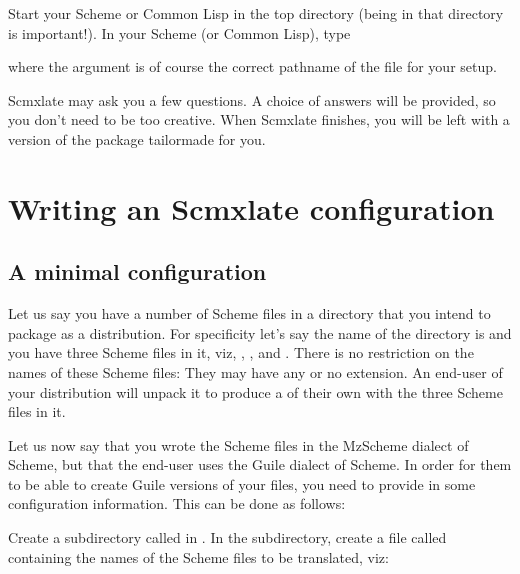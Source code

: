 Start your Scheme or Common Lisp in the top directory
(being in that directory is important!).  In your
Scheme (or Common Lisp), type


\n where the  argument is of course the correct
pathname of the file  for your
setup.

Scmxlate may ask you a few questions.  A
choice of answers will be provided, so you don't need
to be too creative.  When Scmxlate finishes, you
will be left with a version of the package tailormade
for you.

\section{Writing an Scmxlate configuration}
\label{writeconfig}

%

\subsection{A minimal configuration}

Let us say you have a number of Scheme files in
a directory that you intend to package as a
distribution.  For specificity let's say the name of the
directory is  and you have three Scheme files in it,
viz, , , and .
There is no restriction on the names of these Scheme
files: They may have any or no extension.  An end-user
of your distribution will unpack it to produce a
 of their own with the three Scheme files in
it.

Let us now say that you wrote the Scheme files in the
MzScheme dialect of Scheme, but that the end-user
uses the Guile dialect of Scheme.  In order for them to
be able to create Guile versions of your files, you
need to provide in  some configuration
information.  This can be done as follows:

Create a subdirectory called  in
.  In the  subdirectory,
create a file called 
containing the names of the Scheme files to be
translated,  viz:

